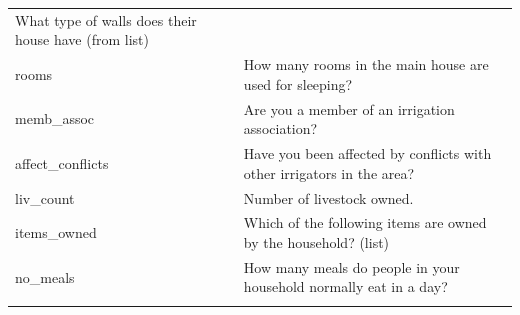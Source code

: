 \documentclass[]{book}
\begin{document}
\begin{longtable}[]{@{}ll@{}}
\begin{minipage}[t]{0.16\columnwidth}
What type of walls does their house have (from list)\strut
\end{minipage}\tabularnewline
\begin{minipage}[t]{0.16\columnwidth}\raggedright\strut
rooms\strut
\end{minipage} & \begin{minipage}[t]{0.16\columnwidth}\raggedright\strut
How many rooms in the main house are used for sleeping?\strut
\end{minipage}\tabularnewline
\begin{minipage}[t]{0.16\columnwidth}\raggedright\strut
memb\_assoc\strut
\end{minipage} & \begin{minipage}[t]{0.16\columnwidth}\raggedright\strut
Are you a member of an irrigation association?\strut
\end{minipage}\tabularnewline
\begin{minipage}[t]{0.16\columnwidth}\raggedright\strut
affect\_conflicts\strut
\end{minipage} & \begin{minipage}[t]{0.16\columnwidth}\raggedright\strut
Have you been affected by conflicts with other irrigators in the
area?\strut
\end{minipage}\tabularnewline
\begin{minipage}[t]{0.16\columnwidth}\raggedright\strut
liv\_count\strut
\end{minipage} & \begin{minipage}[t]{0.16\columnwidth}\raggedright\strut
Number of livestock owned.\strut
\end{minipage}\tabularnewline
\begin{minipage}[t]{0.16\columnwidth}\raggedright\strut
items\_owned\strut
\end{minipage} & \begin{minipage}[t]{0.16\columnwidth}\raggedright\strut
Which of the following items are owned by the household? (list)\strut
\end{minipage}\tabularnewline
\begin{minipage}[t]{0.16\columnwidth}\raggedright\strut
no\_meals\strut
\end{minipage} & \begin{minipage}[t]{0.16\columnwidth}\raggedright\strut
How many meals do people in your household normally eat in a day?\strut
\end{minipage}\tabularnewline
\begin{minipage}[t]{0.16\columnwidth}\raggedright\strut

\end{minipage}
\end{longtable}
\end{document}
